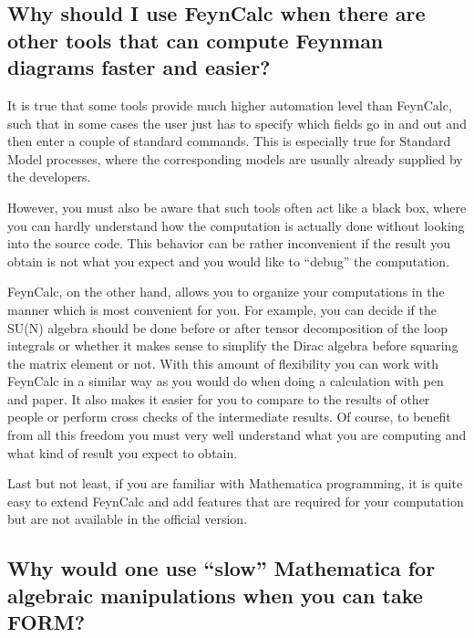 \documentclass[../FeynCalcManual.tex]{subfiles}
\begin{document}
\hypertarget{why-should-i-use-feyncalc-when-there-are-other-tools-that-can-compute-feynman-diagrams-faster-and-easier}{%
\subsection{Why should I use FeynCalc when there are other tools that
can compute Feynman diagrams faster and
easier?}\label{why-should-i-use-feyncalc-when-there-are-other-tools-that-can-compute-feynman-diagrams-faster-and-easier}}

It is true that some tools provide much higher automation level than
FeynCalc, such that in some cases the user just has to specify which
fields go in and out and then enter a couple of standard commands. This
is especially true for Standard Model processes, where the corresponding
models are usually already supplied by the developers.

However, you must also be aware that such tools often act like a black
box, where you can hardly understand how the computation is actually
done without looking into the source code. This behavior can be rather
inconvenient if the result you obtain is not what you expect and you
would like to ``debug'' the computation.

FeynCalc, on the other hand, allows you to organize your computations in
the manner which is most convenient for you. For example, you can decide
if the SU(N) algebra should be done before or after tensor decomposition
of the loop integrals or whether it makes sense to simplify the Dirac
algebra before squaring the matrix element or not. With this amount of
flexibility you can work with FeynCalc in a similar way as you would do
when doing a calculation with pen and paper. It also makes it easier for
you to compare to the results of other people or perform cross checks of
the intermediate results. Of course, to benefit from all this freedom
you must very well understand what you are computing and what kind of
result you expect to obtain.

Last but not least, if you are familiar with Mathematica programming, it
is quite easy to extend FeynCalc and add features that are required for
your computation but are not available in the official version.

\hypertarget{why-would-one-use-slow-mathematica-for-algebraic-manipulations-when-you-can-take-form}{%
\subsection{Why would one use ``slow'' Mathematica for algebraic
manipulations when you can take
FORM?}\label{why-would-one-use-slow-mathematica-for-algebraic-manipulations-when-you-can-take-form}}
\end{document}
